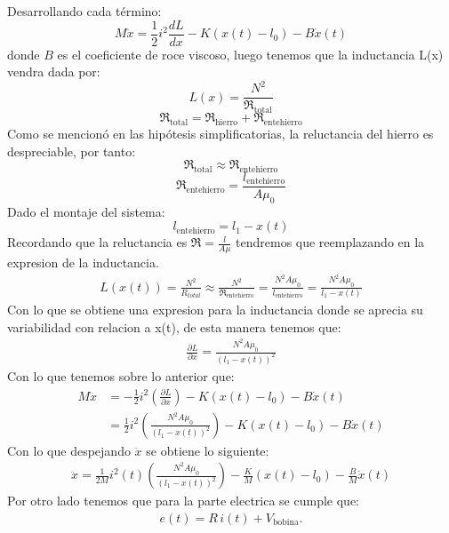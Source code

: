 \documentclass[
  11pt,
  letterpaper,
   addpoints,
   answers
  ]{exam}
\newcommand{\Rel}{\mathfrak{R}} %
\begin{document}
\begin{solution}
      Desarrollando cada término:
      \begin{equation}
        M \ddot{x} = \frac{1}{2} i^2 \frac{dL}{dx} - K(x(t)-l_0) - B \dot{x}(t)
      \end{equation}
      donde $B$ es el coeficiente de roce viscoso, luego tenemos que la inductancia L(x) vendra dada por:
      \begin{equation}
        L(x) = \frac{N^2}{\Rel_{\text{total}}}
      \end{equation}
      \begin{equation}
        \Rel_{\text{total}} = \Rel_{\text{hierro}} + \Rel_{\text{entehierro}}
      \end{equation}
      Como se mencionó en las hipótesis simplificatorias, la reluctancia del hierro es despreciable, por tanto:
      \begin{equation}
        \Rel_{\text{total}} \approx \Rel_{\text{entehierro}}
      \end{equation}
      \begin{equation}
        \Rel_{\text{entehierro}} = \frac{l_{\text{entehierro}}}{A \mu_0}
      \end{equation}
      Dado el montaje del sistema:
      \begin{equation}
        l_{\text{entehierro}} = l_1 - x(t)
      \end{equation}
    Recordando que la reluctancia es $\Rel= \frac{l}{A\mu}$ tendremos que reemplazando en la expresion de la inductancia.
    \begin{align}
      L(x(t)) = \frac{N^{2}}{R_{total}} \approx \frac{N^{2}}{\Rel_{\text{entehierro}}} = \frac{N^{2} A \mu_0}{l_{\text{entehierro}}} = \frac{N^{2} A \mu_0}{l_1 - x(t)}
    \end{align}
    Con lo que se obtiene una expresion para la inductancia donde se aprecia su variabilidad con relacion a x(t), de esta manera tenemos que:
    \begin{align}
        \frac{\partial L}{\partial x} = \frac{N^{2} A \mu_0}{(l_1 - x(t))^2}
    \end{align}
    Con lo que tenemos sobre lo anterior que:
    \begin{align}
      M \ddot{x} &= -\frac{1}{2} i^2 \left(\frac{\partial L}{\partial x}\right) - K(x(t)-l_0) - B \dot{x}(t)\\
      &= \frac{1}{2}i^{2}\left(\frac{N^{2}A\mu_0}{(l_1-x(t))^2}\right) - K(x(t)-l_0) - B \dot{x}(t)
    \end{align}
    Con lo que despejando $ \ddot{x}$ se obtiene lo siguiente:
    \begin{align}
      \ddot{x} = \frac{1}{2M}i^{2}(t) \left(\frac{N^{2}A\mu_0}{(l_1-x(t))^2}\right) - \frac{K}{M}(x(t)-l_0) - \frac{B}{M} \dot{x}(t)
    \end{align}
    Por otro lado tenemos que para la parte electrica se cumple que:
    \begin{align}
e(t) = R\,i(t) + V_{\mathrm{bobina}} .
\end{align}



\end{solution}
\end{document}
